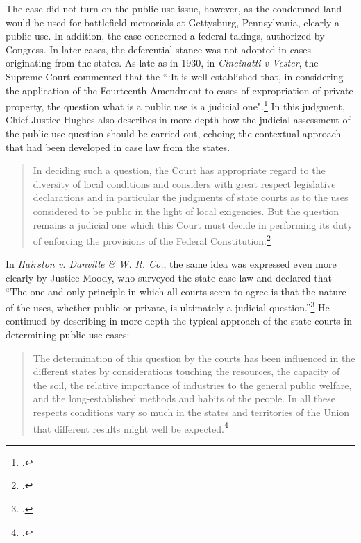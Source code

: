 The case did not turn on the public use issue, however, as the condemned land would be used for battlefield memorials at Gettysburg, Pennsylvania, clearly a public use. In addition, the case concerned a federal takings, authorized by Congress. In later cases, the deferential stance was not adopted in cases originating from the states. As late as in 1930, in {\it Cincinatti v Vester}, the Supreme Court commented that the ``‘It is well established that, in considering the application of the Fourteenth Amendment to cases of expropriation of private property, the question what is a public use is a judicial one".\footcite[447]{vester30} In this judgment, Chief Justice Hughes also describes in more depth how the judicial assessment of the public use question should be carried out, echoing the contextual approach that had been developed in case law from the states.

\begin{quote}
In deciding such a question, the Court has appropriate regard to the diversity of local conditions and considers with great respect legislative declarations and in particular the judgments of state courts as to the uses considered to be public in the light of local exigencies. But the question remains a judicial one which this Court must decide in performing its duty of enforcing the provisions of the Federal Constitution.\footcite[447]{vester30}
\end{quote}

In {\it Hairston v. Danville \& W. R. Co.}, the same idea was expressed even more clearly by Justice Moody, who surveyed the state case law and declared that ``The one and only principle in which all courts seem to agree is that the nature of the uses, whether public or private, is ultimately a judicial question.''\footcite[606]{hairston08} He continued by describing in more depth the typical approach of the state courts in determining public use cases:

\begin{quote}
The determination of this question by the courts has been influenced in the different states by considerations touching the resources, the capacity of the soil, the relative importance of industries to the general public welfare, and the long-established methods and habits of the people. In all these respects conditions vary so much in the states and territories of the Union that different results might well be expected.\footcite[606]{hairston08}
\end{quote}

